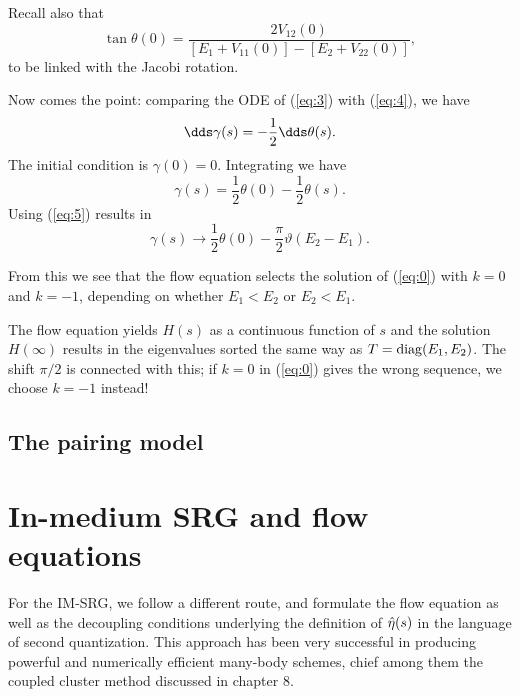 Recall also that 
\[ \tan \theta(0) = \frac{2 V_{12}(0) }{[E_1 + V_{11}(0)]- [E_2 +
  V_{22}(0)]},
\]
to be linked with the Jacobi  rotation.

Now comes the point: comparing the  ODE of (\ref{eq:3}) with 
(\ref{eq:4}), we have
\[ \dds \gamma(s) = -\frac{1}{2} \dds \theta(s). \]
The initial condition is 
$\gamma(0) = 0$. Integrating we have
\[ \gamma(s) = \frac{1}{2}\theta(0) - \frac{1}{2}\theta(s). \]
Using (\ref{eq:5}) results in 
\[ \gamma(s) \rightarrow \frac{1}{2}\theta(0) -
\frac{\pi}{2}\vartheta(E_2-E_1). \]

From this we see that the flow equation selects the solution of (\ref{eq:0}) with
$k=0$ and $k=-1$, depending on whether  $E_1<E_2$ or
$E_2<E_1$.

The flow equation yields $H(s)$ as a continuous function of $s$ and the solution
$H(\infty)$ results in the eigenvalues sorted the same way as
$T = \mathrm{diag}(E_1,E_2)$. The shift $\pi/2$ is connected with this; if $k=0$ in 
(\ref{eq:0}) gives the wrong sequence, we choose $k=-1$ instead!

\subsection{The pairing model}

\section{In-medium SRG and flow equations}

For the IM-SRG, we follow a different route, and formulate the flow equation as well as the decoupling conditions underlying the definition of $\hat{\eta}(s)$ in the language of second quantization. This approach has been very successful in producing powerful and numerically efficient many-body schemes, chief among them the coupled cluster method discussed in chapter 8.

